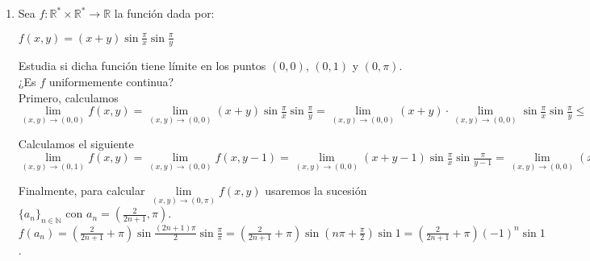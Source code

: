 \documentclass[a4paper, 11pt]{article} %
\begin{document}
\begin{enumerate}
\begin{enumerate}[label=\alph*)]
		$\displaystyle{\lim\limits_{(x,y) \rightarrow (0,0)} f(x,y) = \lim\limits_{(x,y) \rightarrow (0,0)} \frac{x^3-y^3}{x^2+y^2} = \lim\limits_{(x,y) \rightarrow (0,0)} (x-y)\frac{x^2+xy+y^2}{x^2+y^2}} = \displaystyle{\lim\limits_{(x,y) \rightarrow (0,0)} (x-y) \cdot \lim\limits_{(x,y) \rightarrow (0,0)}\frac{x^2+xy+y^2}{x^2+y^2} = 0}$ ya que el primero tiende a 0 y el otro está acotados por 1\footnotemark[10]
		.
		
		Como $f(0,0) = \lim\limits_{(x,y) \rightarrow (0,0)} f(x,y)$, hay continuidad en $(0,0)$.
		\item $\displaystyle{f(x,y) = \frac{\log\left(1+\sqrt{x^2+y^2}\right)}{|x|+|y|}}$\\
		Incompleto.
	\end{enumerate}
	\item Sea $f: \mathbb{R}^* \times \mathbb{R}^* \rightarrow \mathbb{R}$ la función dada por:
	\begin{center}
		$\displaystyle{f(x,y) = (x+y)\sin \frac{\pi}{x}\sin \frac{\pi}{y}}$
	\end{center}
	Estudia si dicha función tiene límite en los puntos $(0,0)$, $(0,1)$ y $(0, \pi)$. ¿Es $f$ uniformemente continua?\\
	Primero, calculamos $\lim\limits_{(x,y)\rightarrow (0,0)} f(x,y) = \lim\limits_{(x,y)\rightarrow (0,0)} (x+y)\displaystyle{\sin \frac{\pi}{x}\sin \frac{\pi}{y}} = \lim\limits_{(x,y)\rightarrow (0,0)} (x+y) \cdot \lim\limits_{(x,y)\rightarrow (0,0)} \displaystyle{\sin \frac{	\pi}{x}\sin \frac{\pi}{y}} \le \lim\limits_{(x,y)\rightarrow (0,0)} (x+y) \cdot 1 = 0$
	
	Calculamos el siguiente $\lim\limits_{(x,y)\rightarrow (0,1)} f(x,y) = \lim\limits_{(x,y)\rightarrow (0,0)} f(x,y-1) = \lim\limits_{(x,y)\rightarrow (0,0)} (x+y-1)\displaystyle{\sin \frac{\pi}{x}\sin \frac{\pi}{y-1}} = \lim\limits_{(x,y)\rightarrow (0,0)} (x+y-1)\displaystyle{\sin \frac{\pi}{x}} \cdot \lim\limits_{(x,y)\rightarrow (0,0)} \displaystyle{\sin \frac{\pi}{y-1}} \le  1 \cdot \lim\limits_{(x,y)\rightarrow (0,0)} \displaystyle{\sin \frac{\pi}{y-1}} = \sin -\pi = 0$
	
	Finalmente, para calcular $\lim\limits_{(x,y)\rightarrow (0,\pi)} f(x,y)$ usaremos la sucesión $\{a_n\}_{n \in \mathbb{N}}$ con $a_n = \displaystyle{\left(\frac{2}{2n+1}, \pi\right)}$.
	$f(a_n) = \displaystyle{\left(\frac{2}{2n+1} + \pi\right) \sin \frac{(2n+1)\pi}{2} \sin \frac{\pi}{\pi}} = \displaystyle{\left(\frac{2}{2n+1} + \pi\right) \sin \left(n\pi + \frac{\pi}{2}\right) \sin 1} = \displaystyle{\left(\frac{2}{2n+1} + \pi\right) (-1)^n \sin 1}$.
	

\end{enumerate}
\end{document}
